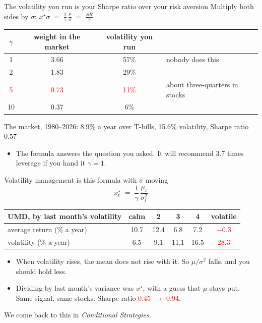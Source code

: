 \documentclass[aspectratio=169,10pt]{beamer}
\begin{document}
\begin{frame}{The volatility you run is your Sharpe ratio over your risk aversion}
Multiply both sides by $\sigma$: \qquad $\displaystyle x^{\star}\sigma \;=\; \frac{1}{\gamma}\,\frac{\mu}{\sigma} \;=\; \frac{SR}{\gamma}$
\vskip 10pt
\begin{center}
\renewcommand{\arraystretch}{1.3}
\begin{tabular}{cccl}
\toprule
$\gamma$ & weight in the market & volatility you run & \\
\midrule
1 & 3.66 & 57\% & nobody does this \\
2 & 1.83 & 29\% & \\
\textcolor{red}{5} & \textcolor{red}{0.73} & \textcolor{red}{11\%} & about three-quarters in stocks \\
10 & 0.37 & 6\% & \\
\bottomrule
\end{tabular}
\end{center}
{\small The market, 1980--2026: 8.9\% a year over T-bills, 15.6\% volatility, Sharpe ratio 0.57}
\vskip 8pt
\begin{itemize}
\item The formula answers the question you asked. It will recommend 3.7 times leverage if you hand it $\gamma=1$.
\end{itemize}
\end{frame}

\begin{frame}{Volatility management is this formula with $\sigma$ moving}
\[ x^{\star}_{t} \;=\; \frac{1}{\gamma}\,\frac{\mu_{t}}{\sigma_{t}^{2}} \]
\vskip 2pt
\begin{center}
\renewcommand{\arraystretch}{1.2}
\begin{tabular}{lccccc}
\toprule
UMD, by last month's volatility & calm & 2 & 3 & 4 & volatile \\
\midrule
average return (\% a year) & 10.7 & 12.4 & 6.8 & 7.2 & \textcolor{red}{$-0.3$} \\
volatility (\% a year) & 6.5 & 9.1 & 11.1 & 16.5 & \textcolor{red}{28.3} \\
\bottomrule
\end{tabular}
\end{center}
\vskip 8pt
\begin{itemize}
\item When volatility rises, the mean does not rise with it. So $\mu/\sigma^{2}$ falls, and you should hold less.
\vskip 6pt
\item Dividing by last month's variance was $x^{\star}$, with a guess that $\mu$ stays put. Same signal, same stocks: Sharpe ratio \textcolor{red}{0.45 $\rightarrow$ 0.94}.
\end{itemize}
\vskip 6pt
\hfill {\small We come back to this in \emph{Conditional Strategies}.}
\end{frame}
\end{document}
